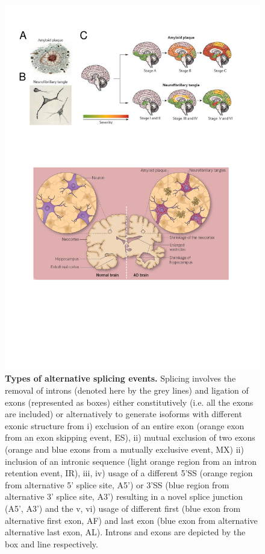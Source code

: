 \begin{figure}[!ht]
	\centering
	\includegraphics[page=9,trim={0 16cm 0cm 0},clip, scale = 0.7]{Figures/Introduction_Figures.pdf}
	\captionsetup{width=0.95\textwidth,singlelinecheck=off}
	\caption[Types of alternative splicing events]%
	{\textbf{Types of alternative splicing events.} Splicing involves the removal of introns (denoted here by the grey lines) and ligation of exons (represented as boxes) either constitutively (i.e. all the exons are included) or alternatively to generate isoforms with different exonic structure from i) exclusion of an entire exon (orange exon from an exon skipping event, ES), ii) mutual exclusion of two exons (orange and blue exons from a mutually exclusive event, MX) ii) inclusion of an intronic sequence (light orange region from an intron retention event, IR), iii, iv) usage of a different 5'SS (orange region from alternative 5' splice site, A5') or 3'SS (blue region from alternative 3' splice site, A3') resulting in a novel splice junction (A5', A3') and the v, vi) usage of different first (blue exon from alternative first exon, AF) and last exon (blue exon from alternative alternative last exon, AL). Introns and exons are depicted by the box and line respectively. 
	}
	\label{fig:AS_events}
\end{figure}

